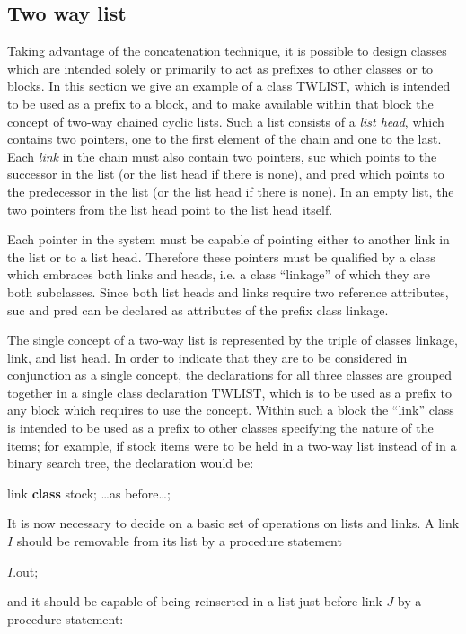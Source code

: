 \documentclass[twoside,11pt]{book}
\begin{document}
\subsection{Two way list}

Taking advantage of the concatenation technique, it is possible to design classes which are intended solely or primarily to act as prefixes to other classes or to blocks. In this section we give an example of a class TWLIST, which is intended to be used as a prefix to a block, and to make available within that block the concept of two-way chained cyclic lists. Such a list consists of a \textit{list head}, which contains two pointers, one to the first element of the chain and one to the last. Each \textit{link} in the chain must also contain two pointers, suc which points to the successor in the list (or the list head if there is none), and pred which points to the predecessor in the list (or the list head if there is none). In an empty list, the two pointers from the list head point to the list head itself.

Each pointer in the system must be capable of pointing either to another link in the list or to a list head. Therefore these pointers must be qualified by a class which embraces both links and heads, i.e. a class ``linkage'' of which they are both subclasses. Since both list heads and links require two reference attributes, suc and pred can be declared as attributes of the prefix class linkage.

The single concept of a two-way list is represented by the triple of classes linkage, link, and list head. In order to indicate that they are to be considered in conjunction as a single concept, the declarations for all three classes are grouped together in a single class declaration TWLIST, which is to be used as a prefix to any block which requires to use the concept. Within such a block the ``link'' class is intended to be used as a prefix to other classes specifying the nature of the items; for example, if stock items were to be held in a two-way list instead of in a binary search tree, the declaration would be:

\quad link \textbf{class} stock; \dots as before\dots;

It is now necessary to decide on a basic set of operations on lists and links. A link $I$ should be removable from its list by a procedure statement

\quad $I$.out;

\noindent
and it should be capable of being reinserted in a list just before link $J$ by a procedure statement:
\end{document}

